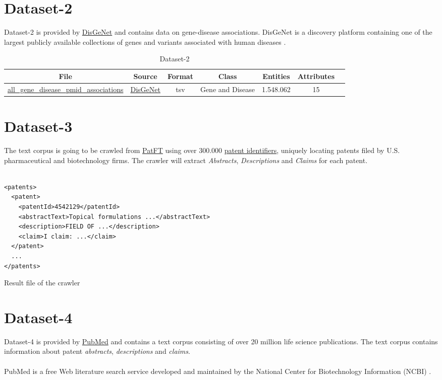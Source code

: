 \documentclass[11pt,titlepage,oneside,openany]{book}
\begin{document}
\section{Dataset-2}
\label{dataset2}
Dataset-2 is provided by \href{https://www.disgenet.org/}{DisGeNet} and contains data on gene-disease associations. DisGeNet is a discovery platform containing one of the largest publicly available collections of genes and variants associated with human diseases \cite{Piero2019TheDK}.
 
\begin{table}[!ht]
\setlength\extrarowheight{2pt} %
\begin{footnotesize}
\begin{tabularx}{\textwidth}{|C|C|C|C|C|C|C|}
\hline
\textbf{File} & \textbf{Source} & \textbf{Format} & \textbf{Class} & \textbf{Entities} & \textbf{Attributes}  \\\hline

	\href{https://nahorgebre.s3.amazonaws.com/all_gene_disease_pmid_associations.tsv}{all\_gene\_disease\_pmid\_associations} & \href{https://www.disgenet.org/}{DisGeNet}  & tsv & Gene and Disease & 1.548.062 & 15 \\
  \hline
\end{tabularx}
\end{footnotesize}
\caption{Dataset-2}
\end{table}

\section{Dataset-3}
\label{dataset3}
The text corpus is going to be crawled from \href{http://patft.uspto.gov/netahtml/PTO/index.html}{PatFT} using over 300.000 \href{https://nahorgebre.s3.amazonaws.com/US_Patents_1985_2016_313392.csv}{patent identifiers}, uniquely locating patents filed by U.S. pharmaceutical and biotechnology firms. The crawler will extract \textit{Abstracts}, \textit{Descriptions} and \textit{Claims} for each patent.
\\
\\
\begin{lstlisting}
<patents>
  <patent>
    <patentId>4542129</patentId>
    <abstractText>Topical formulations ...</abstractText>
    <description>FIELD OF ...</description>
    <claim>I claim: ...</claim>
  </patent>
  ...
</patents>
\end{lstlisting}
\caption{Result file of the crawler}

\section{Dataset-4}
\label{dataset4}
Dataset-4 is provided by \href{https://www.ncbi.nlm.nih.gov/pubmed/}{PubMed} and contains a text corpus consisting of over 20 million life science publications. The text corpus contains information about patent \textit{abstracts}, \textit{descriptions} and \textit{claims}. 
\\
\\
PubMed is a free Web literature search service developed and maintained by the National Center for Biotechnology Information (NCBI) \cite{Lu2011PubMedAB}.
\end{document}
